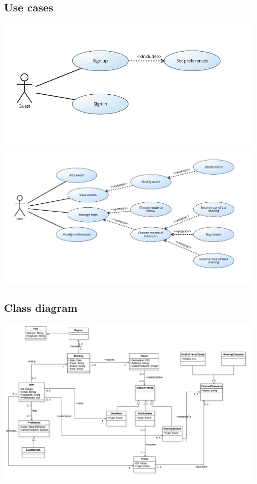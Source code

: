 \subsection*{Use cases}
\begin{center}
\includegraphics[scale=0.55]{MainMatter/images/usecases/guest}
\includegraphics[scale=0.55]{MainMatter/images/usecases/user}
\end{center}
\pagebreak
%
\begin{landscape}
\subsection*{Class diagram}
\begin{center}
\includegraphics[scale=0.2]{MainMatter/images/uml/uml}
\end{center}
\end{landscape}
%
%
